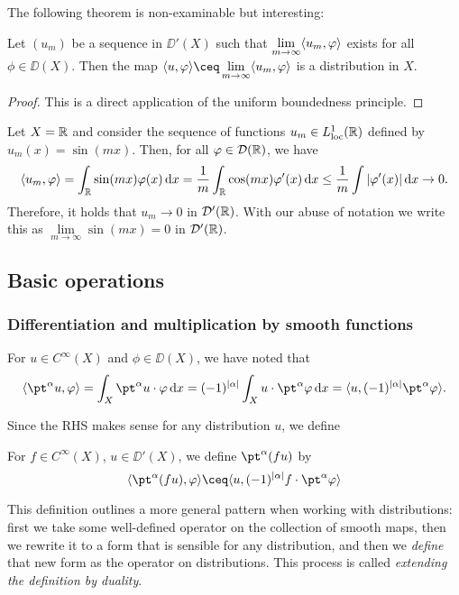 \begin{mdframed}
The following theorem is non-examinable but interesting: 
\begin{theorem}
    Let $(u_m)$ be a sequence in $\DD'(X)$ such that $\lim\limits_{m\to\infty} \langle u_m, \varphi\rangle$ exists for all $\phi \in \DD(X)$. Then the map $\ang{u, \phi} \ceq \lim\limits_{m\to\infty} \ang{u_m, \phi}$ is a distribution in $X$.
\end{theorem}

\begin{proof}
    This is a direct application of the uniform boundedness principle. 
\end{proof}
\end{mdframed}

\begin{example}
    Let $X = \mathbb R$ and consider the sequence of functions $u_m \in L^1_{\mathrm{loc}}(\mathbb R)$ defined by $u_m(x) = \sin(mx)$. Then, for all $\varphi \in \mathcal D(\mathbb R)$, we have
    \[
    \langle u_m, \varphi\rangle = \int_\mathbb R \sin(mx) \varphi(x) \dd{x} = \frac1m \int_\mathbb R \cos(mx) \varphi'(x) \dd{x} \leq \frac1m \int \abs{\varphi'(x)} \dd{x} \to 0.   \]
    Therefore, it holds that $u_m \to 0$ in $\mathcal D'(\mathbb R)$. With our abuse of notation we write this as $\lim\limits_{m\to\infty} \sin(mx) = 0$ in $\mathcal D'(\mathbb R)$. 
\end{example}

\subsection{Basic operations}

\subsubsection{Differentiation and multiplication by smooth functions}
For $u \in C^\infty(X)$ and $\phi \in \DD(X)$, we have noted that
\[
\ang{\pt^\alpha u, \phi} = \int_X \pt^\alpha u \cdot \phi \dd{x} = (-1)^\abs{\alpha}  \int_X u \cdot \pt^\alpha \phi \dd{x} = \ang{u, (-1)^\abs{\alpha} \pt^\alpha \phi}. 
\]

Since the RHS makes sense for any distribution $u$, we define 
\begin{definition}
    For $f \in C^\infty(X)$, $u \in \DD'(X)$, we define $\pt^\alpha(fu)$ by
    \[
    \ang{\pt^\alpha(fu), \phi}  \ceq \ang{u, (-1)^\abs{\alpha} f \cdot  \pt^\alpha \phi}
    \]
\end{definition}

\begin{remark}
    This definition outlines a more general pattern when working with distributions: first we take some well-defined operator on the collection of smooth maps, then we rewrite it to a form that is sensible for any distribution, and then we \emph{define} that new form as the operator on distributions. This process is called \emph{extending the definition by duality}.
\end{remark}

